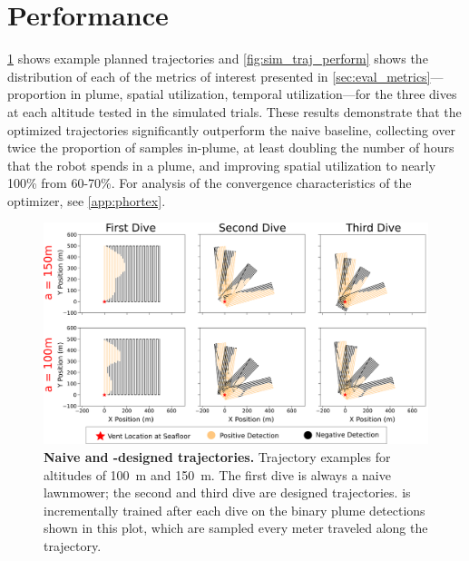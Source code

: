 \section{\PHORTEX Performance}
\label{sec:phortex_perform}
\cref{fig:sim_traj_example} shows example planned trajectories and \cref{fig:sim_traj_perform} shows the distribution of each of the metrics of interest presented in \cref{sec:eval_metrics}---proportion in plume, spatial utilization, temporal utilization---for the three dives at each altitude tested in the simulated trials. These results demonstrate that the \PHORTEX optimized trajectories significantly outperform the naive baseline, collecting over twice the proportion of samples in-plume, at least doubling the number of hours that the robot spends in a plume, and improving spatial utilization to nearly 100\% from 60-70\%. For analysis of the convergence characteristics of the optimizer, see \cref{app:phortex}. 

\begin{figure}[h!]
    \centering
    \includegraphics[width=0.85\columnwidth]{figures/sim_traj.png}
    \caption[Naive and \PHORTEX-design trajectories]{\textbf{Naive and \PHORTEX-designed trajectories.} Trajectory examples for altitudes of \SI{100}{\meter} and \SI{150}{\meter}. The first dive is always a naive lawnmower; the second and third dive are \PHORTEX designed trajectories. \PHUMES is incrementally trained after each dive on the binary plume detections shown in this plot, which are sampled every meter traveled along the trajectory.}
    \label{fig:sim_traj_example}
\end{figure}

